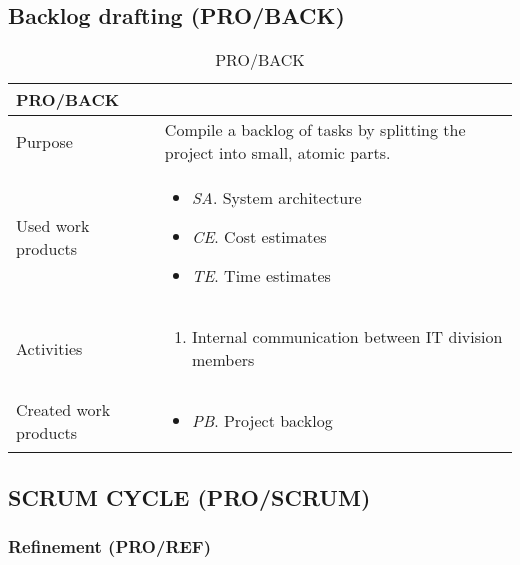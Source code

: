 \subsection{Backlog drafting (PRO/BACK)}
\begin{table}[h!]
\begin{tabular}{l|p{}}
\hline
\textbf{PRO/BACK}        & \textbf{} \\ \hline
Purpose & Compile a backlog of tasks by splitting the project into small, atomic parts.  \\ \hline
Used work products    &      
\begin{itemize}
    \item \textit{SA}. System architecture
    \item \textit{CE}. Cost estimates
    \item \textit{TE}. Time estimates
\end{itemize}
\\ \hline
Activities            &   
\begin{enumerate}
    \item Internal communication between IT division members
\end{enumerate}
\\ \hline
Created work products &     
\begin{itemize}
    \item \textit{PB}. Project backlog
\end{itemize}
\end{tabular}
\caption{PRO/BACK}
\label{pro/back}
\end{table}

\newpage
\subsection{SCRUM CYCLE (PRO/SCRUM)}

\subsubsection{Refinement (PRO/REF)}

